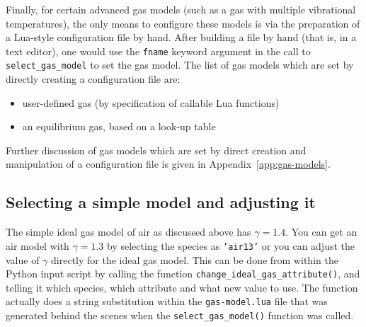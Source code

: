 \documentclass[12pt,a4paper,twoside]{article}
\begin{document}
\medskip
Finally, for certain advanced gas models (such as a gas with multiple vibrational temperatures),
the only means to configure these models is via the preparation of a Lua-style configuration
file by hand.
After building a file by hand (that is, in a text editor), one would use the \texttt{fname} keyword
argument in the call to \texttt{select\_gas\_model} to set the gas model.
The list of gas models which are set by directly creating a configuration file are:
\begin{itemize}
 \item user-defined gas (by specification of callable Lua functions)
 \item an equilibrium gas, based on a look-up table
\end{itemize}
Further discussion of gas models which are set by direct creation
and manipulation of a configuration file is given in Appendix~\ref{app:gas-models}.

\subsection{Selecting a simple model and adjusting it}
The simple ideal gas model of air as discussed above has $\gamma = 1.4$.
You can get an air model with $\gamma = 1.3$ by selecting the species
as \texttt{'air13'} or you can adjust the value of $\gamma$ directly
for the ideal gas model.
This can be done from within the Python input script by calling the function 
\texttt{change\_ideal\_gas\_attribute()},
and telling it which species, which attribute and what new value to use.
The function actually does a string substitution within the \texttt{gas-model.lua} file
that was generated behind the scenes when the \texttt{select\_gas\_model()} function was called.
\end{document}
